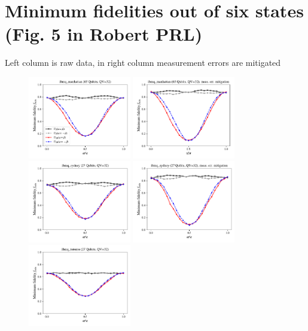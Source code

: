 \documentclass[a4paper]{article}
\begin{document}
\section*{Minimum fidelities out of six states (Fig. 5 in Robert PRL)}
Left column is raw data, in right column measurement errors are mitigated
\begin{figure}[H]
	\centering
	\includegraphics[width=0.4\textwidth]{fmin_qc0_mit1}
	\includegraphics[width=0.4\textwidth]{fmin_qc0_mit0}
	\includegraphics[width=0.4\textwidth]{fmin_qc1_mit1}
	\includegraphics[width=0.4\textwidth]{fmin_qc1_mit0}
	\includegraphics[width=0.4\textwidth]{fmin_qc2_mit1}

\end{figure}
\end{document}
